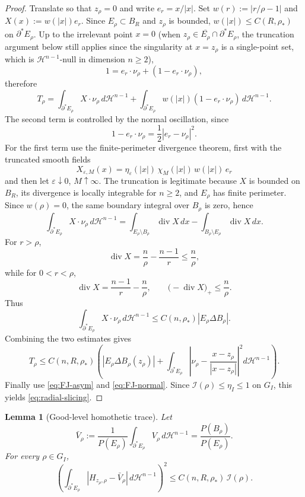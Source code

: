 \documentclass[11pt]{article}
\newtheorem{lemma}[theorem]{Lemma}
\theoremstyle{definition}
\newcommand{\eps}{\varepsilon}
\newcommand{\rstar}{\rho_{*}}
\begin{document}
\begin{proof}
Translate so that $z_\rho=0$ and write $e_r=x/|x|$.  Set
$w(r):=|r/\rho-1|$ and \(X(x):=w(|x|)e_r\).  Since \(E_\rho\subset B_R\)
and \(z_\rho\) is bounded, \(w(|x|)\le C(R,\rstar)\) on
\(\partial^*E_\rho\).  Up to the irrelevant point \(x=0\)
(when $z_\rho\in\overline{E_\rho}\cap\partial^*E_\rho$, the truncation
argument below still applies since the singularity at $x=z_\rho$ is a
single-point set, which is $\mathcal H^{n-1}$-null in dimension $n\ge2$),
\[
   1=e_r\cdot\nu_\rho+(1-e_r\cdot\nu_\rho),
\]
therefore
\[
   T_\rho
   =\int_{\partial^*E_\rho}X\cdot\nu_\rho\,d\mathcal H^{n-1}
    +\int_{\partial^*E_\rho}w(|x|)(1-e_r\cdot\nu_\rho)\,d\mathcal H^{n-1}.
\]
The second term is controlled by the normal oscillation, since
\[
   1-e_r\cdot\nu_\rho=\frac12|e_r-\nu_\rho|^2.
\]
For the first term use the finite-perimeter divergence theorem, first with
the truncated smooth fields
\[
   X_{\eps,M}(x)=\eta_\eps(|x|)\,\chi_M(|x|)\,w(|x|)\,e_r
\]
and then let \(\eps\downarrow0\), \(M\uparrow\infty\).  The truncation is
legitimate because \(X\) is bounded on \(B_R\), its divergence is locally
integrable for \(n\ge2\), and \(E_\rho\) has finite perimeter.  Since
\(w(\rho)=0\), the same boundary integral over \(B_\rho\) is zero, hence
\[
   \int_{\partial^*E_\rho}X\cdot\nu_\rho\,d\mathcal H^{n-1}
   =\int_{E_\rho\setminus B_\rho}\operatorname{div}X\,dx
     -\int_{B_\rho\setminus E_\rho}\operatorname{div}X\,dx .
\]
For \(r>\rho\),
\[
   \operatorname{div}X=\frac n\rho-\frac{n-1}{r}\le \frac n\rho,
\]
while for \(0<r<\rho\),
\[
   \operatorname{div}X=\frac{n-1}{r}-\frac n\rho,
   \qquad
   \bigl(-\operatorname{div}X\bigr)_+\le\frac n\rho .
\]
Thus
\[
   \int_{\partial^*E_\rho}X\cdot\nu_\rho\,d\mathcal H^{n-1}
   \le C(n,\rstar)|E_\rho\Delta B_\rho|.
\]
Combining the two estimates gives
\[
   T_\rho\le C(n,R,\rstar)\left(
      |E_\rho\Delta B_\rho(z_\rho)|
      +\int_{\partial^*E_\rho}
        \left|\nu_\rho-\frac{x-z_\rho}{|x-z_\rho|}\right|^2
        d\mathcal H^{n-1}\right).
\]
Finally use \eqref{eq:FJ-asym} and \eqref{eq:FJ-normal}.  Since
\(\mathcal I(\rho)\le\eta_I\le1\) on \(G_I\), this yields
\eqref{eq:radial-slicing}.
\end{proof}

\begin{lemma}[Good-level homothetic trace]\label{lem:good-htrace}
Let
\[
   \bar V_\rho:=\frac{1}{P(E_\rho)}
       \int_{\partial^*E_\rho}V_\rho\,d\mathcal H^{n-1}
       =\frac{P(B_\rho)}{P(E_\rho)}.
\]
For every $\rho\in G_I$,
\begin{equation}\label{eq:htrace-good}
   \left(\int_{\partial^*E_\rho}|H_{z_\rho,\rho}-\bar V_\rho|\,
       d\mathcal H^{n-1}\right)^2
   \le C(n,R,\rstar)\,\mathcal I(\rho).
\end{equation}
\end{lemma}
\end{document}
